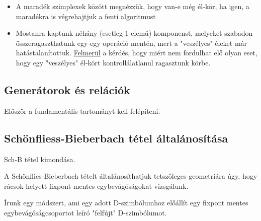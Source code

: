 \documentclass[12pt,magyar,a4paper]{article}
\begin{document}
\begin{itemize}
\begin{figure}
{      fundamentális tartomány}
      \center
      \texttt{[image: fund-tart\_rajz23d.png]}
    \end{figure}
  \item A maradék szimplexek között megnézzük, hogy van-e még él-kör, ha igen,
    a maradékra is végrehajtjuk a fenti algoritmust
  \item Mostanra kaptunk néhány (esetleg 1 elemű) komponenst, melyeket szabadon
    összeragaszthatunk egy-egy operáció mentén, mert a "veszélyes" éleket már
    hatástalanítottuk. \underline{Felmerül} a kérdés, hogy miért nem fordulhat elő olyan
    eset, hogy egy "veszélyes" él-kört kontrollálatlanul ragasztunk körbe.
\end{itemize}

\subsection{Generátorok és relációk}
Először a fundamentális tartományt kell felépíteni.

\subsection{Schönfliess-Bieberbach tétel általánosítása}
Sch-B tétel kimondása.

A Schönflies-Bieberbach tételt általánosíthatjuk tetszőleges geometriára
úgy, hogy rácsok helyett fixpont mentes egybevágóságokat vizsgálunk.

Írunk egy módszert, ami egy adott D-szimbólumhoz előállít egy fixpont mentes
egybevágóságcsoportot leíró "felfújt" D-szimbólumot.
\end{document}
